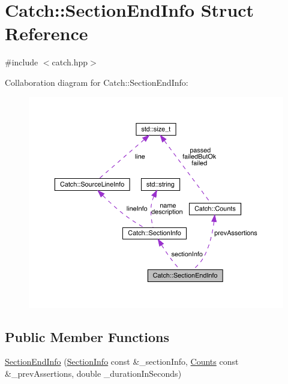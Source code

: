 \hypertarget{struct_catch_1_1_section_end_info}{}\section{Catch\+:\+:Section\+End\+Info Struct Reference}
\label{struct_catch_1_1_section_end_info}


{\ttfamily \#include $<$catch.\+hpp$>$}



Collaboration diagram for Catch\+:\+:Section\+End\+Info\+:
\nopagebreak
\begin{figure}[H]
\begin{center}
\leavevmode
\includegraphics[width=350pt]{struct_catch_1_1_section_end_info__coll__graph}
\end{center}
\end{figure}
\subsection*{Public Member Functions}
\begin{DoxyCompactItemize}
\item 
\hyperlink{struct_catch_1_1_section_end_info_abc9381c7c22b6907317ec985ccaa6713}{Section\+End\+Info} (\hyperlink{struct_catch_1_1_section_info}{Section\+Info} const \&\+\_\+section\+Info, \hyperlink{struct_catch_1_1_counts}{Counts} const \&\+\_\+prev\+Assertions, double \+\_\+duration\+In\+Seconds)
\end{DoxyCompactItemize}
